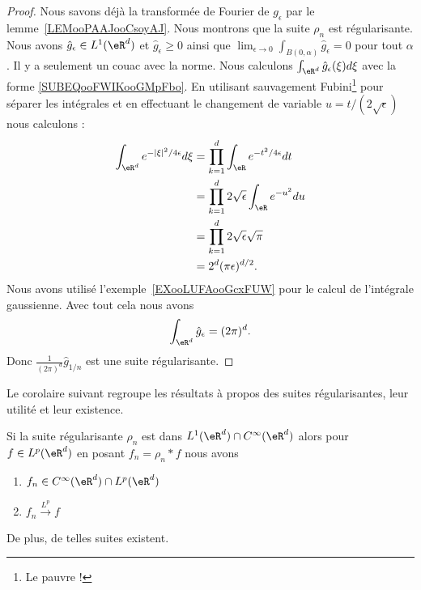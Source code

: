 \begin{proof}
	Nous savons déjà la transformée de Fourier de \( g_{\epsilon}\) par le lemme~\ref{LEMooPAAJooCsoyAJ}. Nous montrons que la suite \( \rho_n\) est régularisante. Nous avons \( \hat g_{\epsilon}\in L^1(\eR^d)\) et \( \hat g_{\epsilon}\geq 0\) ainsi que \( \lim_{\epsilon\to 0}\int_{B(0,\alpha)}\hat  g_{\epsilon}=0\) pour tout \( \alpha\). Il y a seulement un couac avec la norme. Nous calculons \( \int_{\eR^d}\hat g_{\epsilon}(\xi)d\xi\) avec la forme \eqref{SUBEQooFWIKooGMpFbo}. En utilisant sauvagement Fubini\footnote{Le pauvre !} pour séparer les intégrales et en effectuant le changement de variable \( u=t/(2\sqrt{ \epsilon })\) nous calculons :
	\begin{subequations}
		\begin{align}
			\int_{\eR^d} e^{-| \xi |^2/4\epsilon}d\xi & =\prod_{k=1}^d\int_{\eR} e^{-t^2/4\epsilon}dt         \\
			                                          & =\prod_{k=1}^d2\sqrt{ \epsilon }\int_{\eR} e^{-u^2}du \\
			                                          & =\prod_{k=1}^d2\sqrt{ \epsilon }\sqrt{ \pi }          \\
			                                          & =2^d(\pi\epsilon)^{d/2}.
		\end{align}
	\end{subequations}
	Nous avons utilisé l'exemple~\ref{EXooLUFAooGcxFUW} pour le calcul de l'intégrale gaussienne. Avec tout cela nous avons
	\begin{equation}
		\int_{\eR^d}\hat g_{\epsilon}=(2\pi)^d.
	\end{equation}
	Donc \( \frac{1}{ (2\pi)^d }\hat g_{1/n}\) est une suite régularisante.
\end{proof}

Le corolaire suivant regroupe les résultats à propos des suites régularisantes, leur utilité et leur existence.
\begin{corollary}       \label{CORooQLELooUjzIoM}
	Si la suite régularisante \( \rho_n\) est dans \( L^1(\eR^d)\cap  C^{\infty}(\eR^d)\) alors pour \( f\in L^p(\eR^d)\) en posant \( f_n=\rho_n*f\) nous avons
	\begin{enumerate}
		\item
		      \( f_n\in C^{\infty}(\eR^d)\cap L^p(\eR^d)\)
		\item
		      \( f_n\stackrel{L^p}{\longrightarrow}f\)
	\end{enumerate}
	De plus, de telles suites existent.
\end{corollary}

